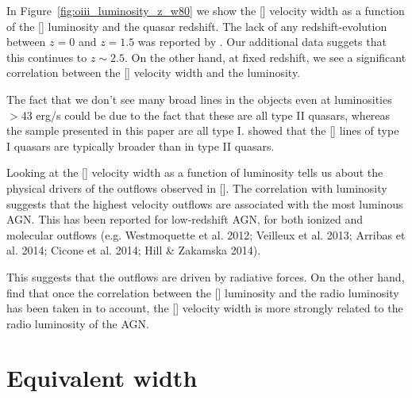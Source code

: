 In Figure~\ref{fig:oiii_luminosity_z_w80} we show the [] velocity width as a function of the [] luminosity and the quasar redshift. 
The lack of any redshift-evolution between $z=0$ and $z=1.5$ was reported by \citet{harrison16}.
Our additional data suggets that this continues to $z\sim2.5$. 
On the other hand, at fixed redshift, we see a significant correlation between the [] velocity width and the luminosity. 

The fact that we don't see many broad lines in the \citet{zakamska14} objects even at luminosities $>$43 erg/s could be due to the fact that these are all type II quasars, whereas the sample presented in this paper are all type I. 
\citet{mullaney13} showed that the [] lines of type I quasars are typically broader than in type II quasars. 

Looking at the [] velocity width as a function of luminosity tells us about the physical drivers of the outflows observed in []. 
The correlation with luminosity suggests that the highest velocity outflows are associated with the most luminous AGN. 
This has been reported for low-redshift AGN, for both ionized and molecular outflows (e.g. Westmoquette et al. 2012; Veilleux et al. 2013; Arribas et al. 2014; Cicone et al. 2014; Hill \& Zakamska 2014).

This suggests that the outflows are driven by radiative forces. 
On the other hand, \citet{mullaney13} find that once the correlation between the [] luminosity and the radio luminosity has been taken in to account, the [] velocity width is more strongly related to the radio luminosity of the AGN. 

\section{Equivalent width}

